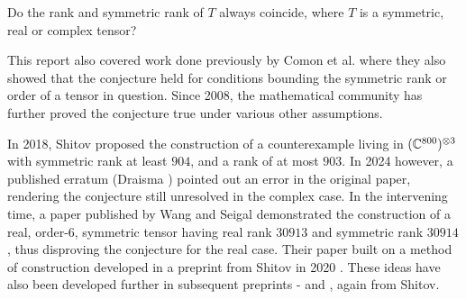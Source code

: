 \documentclass[../Lael_John_MasterThesis_Draft.tex]{subfiles}
\begin{document}
\begin{conjecture}
    Do the rank and symmetric rank of $T$ always coincide, where $T$ is a symmetric, real or complex tensor?
\end{conjecture}

This report also covered work done previously by Comon et al. \cite{comon_symmetric_2008} where they also showed that the conjecture held for conditions bounding the symmetric rank or order of a tensor in question. 
Since 2008, the mathematical community has further proved the conjecture true under various other assumptions. 

In 2018, Shitov \cite{shitov_counterexample_2018} proposed the construction of a counterexample living in $(\mathbb{C}^{800})^{\otimes 3}$ with symmetric rank at least $904$, and a rank of at most $903$. In 2024 however, a published erratum (Draisma \cite{draisma_erratum_2024}) pointed out an error in the original paper, rendering the conjecture still unresolved in the complex case. In the intervening time, a paper published by Wang and Seigal \cite{wang_lower_2023} demonstrated the construction of a real, order-$6$, symmetric tensor having real rank $30913$ and symmetric rank $30914$, thus disproving the conjecture for the real case. Their paper built on a method of construction developed in a preprint from Shitov in 2020 \cite{shitov_comons_2020}. These ideas have also been developed further in subsequent preprints - \cite{shitov_higher_2024} and \cite{shitov_higher_2024-1}, again from Shitov.

%
\end{document}
